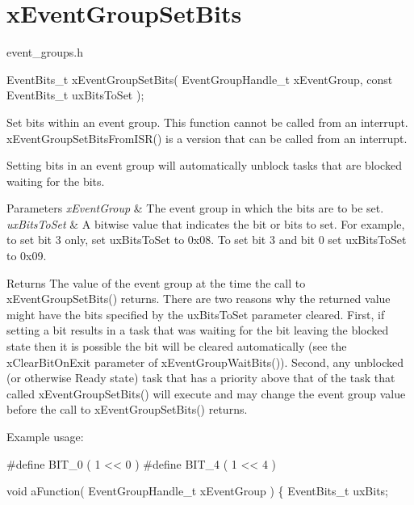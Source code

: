 \hypertarget{group__xEventGroupSetBits}{}\section{x\+Event\+Group\+Set\+Bits}
\label{group__xEventGroupSetBits}
event\+\_\+groups.\+h 
\begin{DoxyPre}
   EventBits\_t xEventGroupSetBits( EventGroupHandle\_t xEventGroup, const EventBits\_t uxBitsToSet );
\end{DoxyPre}


Set bits within an event group. This function cannot be called from an interrupt. x\+Event\+Group\+Set\+Bits\+From\+I\+S\+R() is a version that can be called from an interrupt.

Setting bits in an event group will automatically unblock tasks that are blocked waiting for the bits.


\begin{DoxyParams}{Parameters}
{\em x\+Event\+Group} & The event group in which the bits are to be set.\\
\hline
{\em ux\+Bits\+To\+Set} & A bitwise value that indicates the bit or bits to set. For example, to set bit 3 only, set ux\+Bits\+To\+Set to 0x08. To set bit 3 and bit 0 set ux\+Bits\+To\+Set to 0x09.\\
\hline
\end{DoxyParams}
\begin{DoxyReturn}{Returns}
The value of the event group at the time the call to x\+Event\+Group\+Set\+Bits() returns. There are two reasons why the returned value might have the bits specified by the ux\+Bits\+To\+Set parameter cleared. First, if setting a bit results in a task that was waiting for the bit leaving the blocked state then it is possible the bit will be cleared automatically (see the x\+Clear\+Bit\+On\+Exit parameter of x\+Event\+Group\+Wait\+Bits()). Second, any unblocked (or otherwise Ready state) task that has a priority above that of the task that called x\+Event\+Group\+Set\+Bits() will execute and may change the event group value before the call to x\+Event\+Group\+Set\+Bits() returns.
\end{DoxyReturn}
Example usage\+: 
\begin{DoxyPre}
  #define BIT\_0 ( 1 << 0 )
  #define BIT\_4 ( 1 << 4 )\end{DoxyPre}



\begin{DoxyPre}  void aFunction( EventGroupHandle\_t xEventGroup )
  \{
  EventBits\_t uxBits;\end{DoxyPre}



